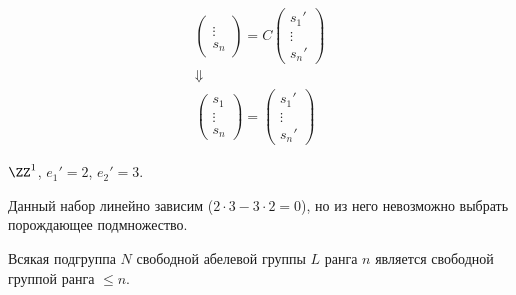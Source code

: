 \begin{itemize}
\begin{gather*}
\begin{pmatrix}
                \\
                \vdots
                \\
                s_n
            \end{pmatrix}
            =
            C
            \begin{pmatrix}
                s_1'
                \\
                \vdots
                \\
                s_n'
            \end{pmatrix}
            \\
            \Downarrow
            \\
            \begin{pmatrix}
                s_1
                \\
                \vdots
                \\
                s_n
            \end{pmatrix}
            =
            \begin{pmatrix}
                s_1'
                \\
                \vdots
                \\
                s_n'
            \end{pmatrix}
        \end{gather*}
\end{itemize}

\begin{example}{}{}
    \( \ZZ^1 \), \( e_1' = 2 \), \( e_2' = 3 \).

    Данный набор линейно зависим (\( 2 \cdot 3 - 3 \cdot 2 = 0 \)),
    но из него невозможно выбрать порождающее подмножество.
\end{example}

\begin{thrm}{}{}
    Всякая подгруппа \( N \) свободной абелевой группы \( L \) ранга \( n \)
    является свободной группой ранга \( \leq n \).
\end{thrm}

